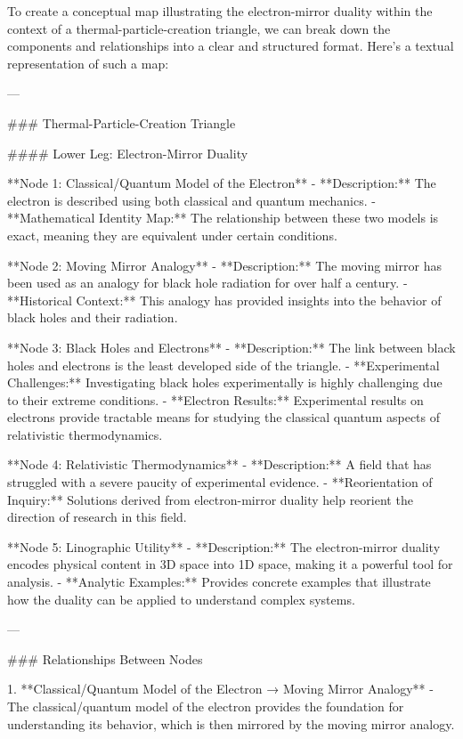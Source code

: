 To create a conceptual map illustrating the electron-mirror duality within the context of a thermal-particle-creation triangle, we can break down the components and relationships into a clear and structured format. Here’s a textual representation of such a map:

---

### Thermal-Particle-Creation Triangle

#### Lower Leg: Electron-Mirror Duality

**Node 1: Classical/Quantum Model of the Electron**
- **Description:** The electron is described using both classical and quantum mechanics.
- **Mathematical Identity Map:** The relationship between these two models is exact, meaning they are equivalent under certain conditions.

**Node 2: Moving Mirror Analogy**
- **Description:** The moving mirror has been used as an analogy for black hole radiation for over half a century.
- **Historical Context:** This analogy has provided insights into the behavior of black holes and their radiation.

**Node 3: Black Holes and Electrons**
- **Description:** The link between black holes and electrons is the least developed side of the triangle.
- **Experimental Challenges:** Investigating black holes experimentally is highly challenging due to their extreme conditions.
- **Electron Results:** Experimental results on electrons provide tractable means for studying the classical quantum aspects of relativistic thermodynamics.

**Node 4: Relativistic Thermodynamics**
- **Description:** A field that has struggled with a severe paucity of experimental evidence.
- **Reorientation of Inquiry:** Solutions derived from electron-mirror duality help reorient the direction of research in this field.

**Node 5: Linographic Utility**
- **Description:** The electron-mirror duality encodes physical content in 3D space into 1D space, making it a powerful tool for analysis.
- **Analytic Examples:** Provides concrete examples that illustrate how the duality can be applied to understand complex systems.

---

### Relationships Between Nodes

1. **Classical/Quantum Model of the Electron → Moving Mirror Analogy**
   - The classical/quantum model of the electron provides the foundation for understanding its behavior, which is then mirrored by the moving mirror analogy.

